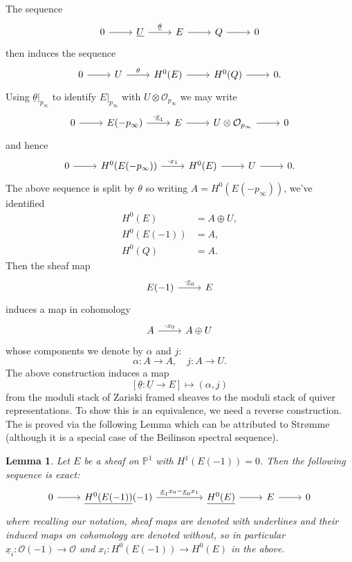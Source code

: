 \documentclass{amsart}
\newtheorem{lemma}[theorem]{Lemma}
\theoremstyle{definition}
\newcommand{\PP}{\mathbb{P}}
\newcommand{\OO}{\mathcal{O}}
\newcommand{\UL}[1]{\underline{#1}}
\begin{document}
The sequence
\[
\begin{tikzcd}
0\arrow[r]& \UL{U} \arrow{r}{\UL{\theta}} & E\arrow[r]&Q\arrow[r]&0
\end{tikzcd}
\]
then induces the sequence
\[
\begin{tikzcd}
0\arrow[r]& {U} \arrow{r}{{\theta}} &H^{0}(E)\arrow[r]&H^{0}(Q)\arrow[r]&0.
\end{tikzcd}
\]
Using $\UL{\theta}|_{p_{\infty}}$ to identify $E|_{p_{\infty}}$ with
$U\otimes \OO_{p_{\infty}}$ we may write
\[
\begin{tikzcd}
0\arrow[r]&E(-p_{\infty})\arrow{r}{\cdot \UL{x}_{1}}
&E\arrow[r]&U\otimes \OO_{p_{\infty}} \arrow[r] &0
\end{tikzcd}
\]
and hence
\[
\begin{tikzcd}
0\arrow[r]&H^{0}(E(-p_{\infty}))\arrow{r}{\cdot {x}_{1}}
&H^{0}(E)\arrow[r]&U \arrow[r] &0.
\end{tikzcd}
\]
The above sequence is split by $\theta$ so writing
$A=H^{0}(E(-p_{\infty}))$, we've identified
\begin{align*}
H^{0}(E) &= A\oplus U,\\
H^{0}(E(-1))&= A,\\
H^{0}(Q)&= A.
\end{align*}
Then the sheaf map
\[
\begin{tikzcd}
E(-1)\arrow{r}{\cdot \UL{x}_{0}}
&E
\end{tikzcd}
\]
induces a map in cohomology
\[
\begin{tikzcd}
A\arrow{r}{\cdot x_{0}} &A\oplus U
\end{tikzcd}
\]
whose components we denote by $\alpha$ and $j$:
\[
\alpha :A\to A, \quad j: A\to U.
\]
The above construction induces a map 
\[
[\UL{\theta}:\UL{U}\to E]\mapsto (\alpha ,j)
\]
from the moduli stack of Zariski framed sheaves to the moduli stack of
quiver representations. To show this is an equivalence, we need a
reverse construction. The is proved via the following Lemma which can
be attributed to Str\o mme \cite[Prop~1.1]{Stromme} (although it is a
special case of the Beilinson spectral sequence).
\begin{lemma}\label{lem: Stromme}
Let $E$ be a sheaf on $\PP^{1}$ with $H^{1}(E(-1))=0$. Then the following
sequence is exact:
\[
\begin{tikzcd}
0\arrow{r} & \UL{H^{0}(E(-1))}(-1)
\arrow{rr}{\UL{x}_{1}x_{0}-\UL{x}_{0}x_{1}}& &
\UL{H^{0}(E)} \arrow{r} & E\arrow[r] & 0
\end{tikzcd}
\]
where recalling our notation, sheaf maps are denoted with
underlines and their induced maps on cohomology are denoted without,
so in particular $\UL{x}_{i}:\OO (-1)\to \OO$ and
$x_{i}:H^{0}(E(-1))\to H^{0}(E)$ in the above.
\end{lemma}
\end{document}
